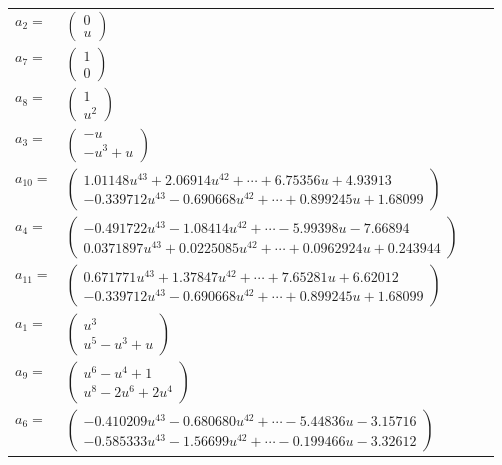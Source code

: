 \documentclass[1p]{elsarticle_modified}
\theoremstyle{definition}
\begin{document}
\begin{tabular}{m{7pt} m{180pt} m{7pt} m{180pt} }
\flushright $a_{2}=$&$\begin{pmatrix}0\\u\end{pmatrix}$ \\
\flushright $a_{7}=$&$\begin{pmatrix}1\\0\end{pmatrix}$ \\
\flushright $a_{8}=$&$\begin{pmatrix}1\\u^2\end{pmatrix}$ \\
\flushright $a_{3}=$&$\begin{pmatrix}- u\\- u^3+u\end{pmatrix}$ \\
\flushright $a_{10}=$&$\begin{pmatrix}1.01148 u^{43}+2.06914 u^{42}+\cdots+6.75356 u+4.93913\\-0.339712 u^{43}-0.690668 u^{42}+\cdots+0.899245 u+1.68099\end{pmatrix}$ \\
\flushright $a_{4}=$&$\begin{pmatrix}-0.491722 u^{43}-1.08414 u^{42}+\cdots-5.99398 u-7.66894\\0.0371897 u^{43}+0.0225085 u^{42}+\cdots+0.0962924 u+0.243944\end{pmatrix}$ \\
\flushright $a_{11}=$&$\begin{pmatrix}0.671771 u^{43}+1.37847 u^{42}+\cdots+7.65281 u+6.62012\\-0.339712 u^{43}-0.690668 u^{42}+\cdots+0.899245 u+1.68099\end{pmatrix}$ \\
\flushright $a_{1}=$&$\begin{pmatrix}u^3\\u^5- u^3+u\end{pmatrix}$ \\
\flushright $a_{9}=$&$\begin{pmatrix}u^6- u^4+1\\u^8-2 u^6+2 u^4\end{pmatrix}$ \\
\flushright $a_{6}=$&$\begin{pmatrix}-0.410209 u^{43}-0.680680 u^{42}+\cdots-5.44836 u-3.15716\\-0.585333 u^{43}-1.56699 u^{42}+\cdots-0.199466 u-3.32612\end{pmatrix}$ \\

\end{tabular}
\end{document}
